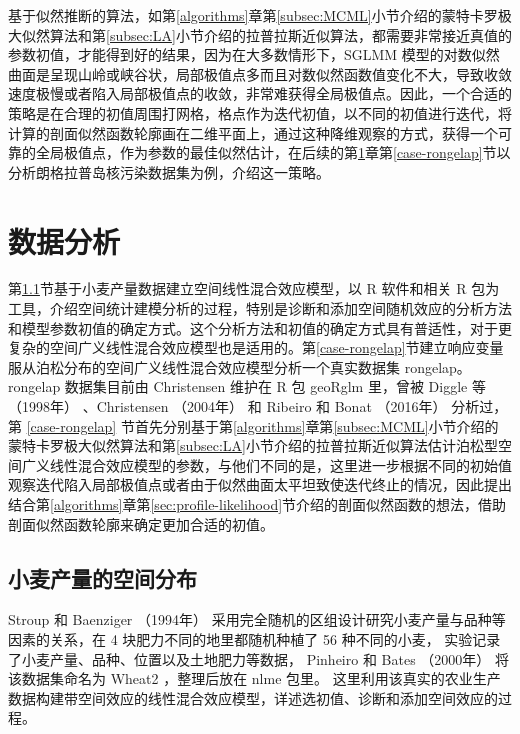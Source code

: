 \documentclass[12pt,a4paper,UTF8,twoside]{book}
\theoremstyle{definition}
\theoremstyle{definition}
\theoremstyle{definition}
\theoremstyle{remark}
\begin{document}
基于似然推断的算法，如第\ref{algorithms}章第\ref{subsec:MCML}小节介绍的蒙特卡罗极大似然算法和第\ref{subsec:LA}小节介绍的拉普拉斯近似算法，都需要非常接近真值的参数初值，才能得到好的结果，因为在大多数情形下，SGLMM
模型的对数似然曲面是呈现山岭或峡谷状，局部极值点多而且对数似然函数值变化不大，导致收敛速度极慢或者陷入局部极值点的收敛，非常难获得全局极值点。因此，一个合适的策略是在合理的初值周围打网格，格点作为迭代初值，以不同的初值进行迭代，将计算的剖面似然函数轮廓画在二维平面上，通过这种降维观察的方式，获得一个可靠的全局极值点，作为参数的最佳似然估计，在后续的第\ref{applications}章第\ref{case-rongelap}节以分析朗格拉普岛核污染数据集为例，介绍这一策略。

\hypertarget{applications}{%
\chapter{数据分析}\label{applications}}

第\ref{sec:spatial-random-effects}节基于小麦产量数据建立空间线性混合效应模型，以
R 软件和相关 R
包为工具，介绍空间统计建模分析的过程，特别是诊断和添加空间随机效应的分析方法和模型参数初值的确定方式。这个分析方法和初值的确定方式具有普适性，对于更复杂的空间广义线性混合效应模型也是适用的。第\ref{case-rongelap}节建立响应变量服从泊松分布的空间广义线性混合效应模型分析一个真实数据集
rongelap。rongelap 数据集目前由 Christensen 维护在 R 包 geoRglm 里，曾被
Diggle 等 （1998年） \citep{Diggle1998} 、Christensen （2004年）
\citep{Christensen2004} 和 Ribeiro 和 Bonat （2016年）
\citep{Bonat2016Practical} 分析过，第 \ref{case-rongelap}
节首先分别基于第\ref{algorithms}章第\ref{subsec:MCML}小节介绍的蒙特卡罗极大似然算法和第\ref{subsec:LA}小节介绍的拉普拉斯近似算法估计泊松型空间广义线性混合效应模型的参数，与他们不同的是，这里进一步根据不同的初始值观察迭代陷入局部极值点或者由于似然曲面太平坦致使迭代终止的情况，因此提出结合第\ref{algorithms}章第\ref{sec:profile-likelihood}节介绍的剖面似然函数的想法，借助剖面似然函数轮廓来确定更加合适的初值。

\hypertarget{sec:spatial-random-effects}{%
\section{小麦产量的空间分布}\label{sec:spatial-random-effects}}

Stroup 和 Baenziger （1994年） \citep{Stroup1994}
采用完全随机的区组设计研究小麦产量与品种等因素的关系，在 4
块肥力不同的地里都随机种植了 56 种不同的小麦，
实验记录了小麦产量、品种、位置以及土地肥力等数据， Pinheiro 和 Bates
（2000年） \citep{Pinheiro2000} 将该数据集命名为 Wheat2 ，整理后放在
nlme 包里。
这里利用该真实的农业生产数据构建带空间效应的线性混合效应模型，详述选初值、诊断和添加空间效应的过程。
\end{document}
